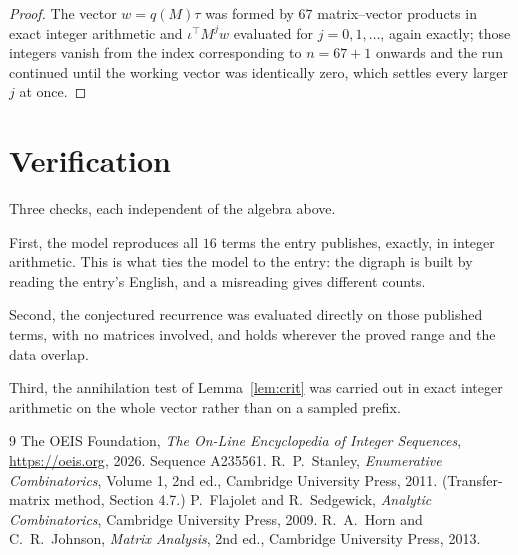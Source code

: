 \documentclass[11pt,a4paper]{article}
\theoremstyle{plain}
\theoremstyle{definition}
\begin{document}
\begin{proof}
The vector $w=q(M)\tau$ was formed by $67$ matrix--vector products in exact integer
arithmetic and $\iota^{\!\top}M^{j}w$ evaluated for $j=0,1,\dots$, again exactly; those
integers vanish from the index corresponding to $n=67+1$ onwards and the run continued
until the working vector was identically zero, which settles every larger $j$ at once.
\end{proof}

\section{Verification}

Three checks, each independent of the algebra above.

First, the model reproduces all $16$ terms the entry publishes, exactly, in integer
arithmetic. This is what ties the model to the entry: the digraph is built by reading the
entry's English, and a misreading gives different counts.

Second, the conjectured recurrence was evaluated directly on those published terms, with no
matrices involved, and holds wherever the proved range and the data overlap.

Third, the annihilation test of Lemma~\ref{lem:crit} was carried out in exact integer
arithmetic on the whole vector rather than on a sampled prefix.

\begin{thebibliography}{9}
 The OEIS Foundation, \emph{The On-Line Encyclopedia of Integer
Sequences}, \url{https://oeis.org}, 2026. Sequence A235561.
 R.~P.~Stanley, \emph{Enumerative Combinatorics}, Volume 1, 2nd ed.,
Cambridge University Press, 2011. (Transfer-matrix method, Section 4.7.)
 P.~Flajolet and R.~Sedgewick, \emph{Analytic Combinatorics}, Cambridge
University Press, 2009.
 R.~A.~Horn and C.~R.~Johnson, \emph{Matrix Analysis}, 2nd ed., Cambridge
University Press, 2013.
\end{thebibliography}
\end{document}
